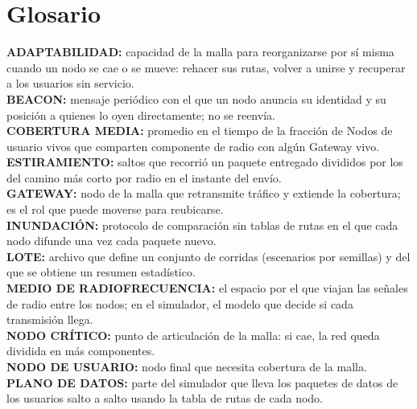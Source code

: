 \chapter*{Glosario}

\textbf{ADAPTABILIDAD:} capacidad de la malla para reorganizarse por sí misma cuando un nodo se cae o se mueve: rehacer sus rutas, volver a unirse y recuperar a los usuarios sin servicio.\\

\textbf{BEACON:} mensaje periódico con el que un nodo anuncia su identidad y su posición a quienes lo oyen directamente; no se reenvía.\\

\textbf{COBERTURA MEDIA:} promedio en el tiempo de la fracción de Nodos de usuario vivos que comparten componente de radio con algún Gateway vivo.\\

\textbf{ESTIRAMIENTO:} saltos que recorrió un paquete entregado divididos por los del camino más corto por radio en el instante del envío.\\

\textbf{GATEWAY:} nodo de la malla que retransmite tráfico y extiende la cobertura; es el rol que puede moverse para reubicarse.\\

\textbf{INUNDACIÓN:} protocolo de comparación sin tablas de rutas en el que cada nodo difunde una vez cada paquete nuevo.\\

\textbf{LOTE:} archivo que define un conjunto de corridas (escenarios por semillas) y del que se obtiene un resumen estadístico.\\

\textbf{MEDIO DE RADIOFRECUENCIA:} el espacio por el que viajan las señales de radio entre los nodos; en el simulador, el modelo que decide si cada transmisión llega.\\

\textbf{NODO CRÍTICO:} punto de articulación de la malla: si cae, la red queda dividida en más componentes.\\

\textbf{NODO DE USUARIO:} nodo final que necesita cobertura de la malla.\\

\textbf{PLANO DE DATOS:} parte del simulador que lleva los paquetes de datos de los usuarios salto a salto usando la tabla de rutas de cada nodo.\\

